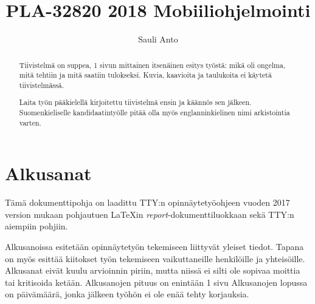 \documentclass[globalnumbering,centeredcaptions,draftfooter]{tutthesis/tutthesis} %
\author{Sauli Anto}
\title{PLA-32820 2018 Mobiiliohjelmointi}
\begin{document}
\maketitle



\begin{abstract}
Tiivistelmä on suppea, 1 sivun mittainen itsenäinen esitys työstä: mikä oli ongelma, mitä tehtiin ja mitä saatiin tulokseksi.
Kuvia, kaavioita ja taulukoita ei käytetä tiivistelmässä.

Laita työn pääkielellä kirjoitettu tiivistelmä ensin ja käännös sen jälkeen.
Suomenkieliselle kandidaatintyölle pitää olla myös englanninkielinen nimi arkistointia varten.
\end{abstract}

\iffalse
\begin{otherlanguage}{english}

\title{Tampere University of Technology thesis template}
\programme{...}
\thesisdescription{...}

\begin{abstract}
The abstract is a self-contained, concise description of the thesis: what was the problem, what was done, what was the result.
Do not include charts or tables in the abstract.

First include the abstract written in the main language of the thesis and then the translation.
A bachelor's thesis in Finnish must also have a name in English for archival.
\end{abstract}
\end{otherlanguage}
\fi


\chapter*{Alkusanat}

Tämä dokumenttipohja on laadittu TTY:n opinnäytetyöohjeen vuoden 2017 version mukaan pohjautuen LaTeXin \emph{report}-dokumenttiluokkaan sekä TTY:n aiempiin pohjiin.

Alkusanoissa esitetään opinnäytetyön tekemiseen liittyvät yleiset tiedot.
Tapana on myös esittää kiitokset työn tekemiseen vaikuttaneille henkilöille ja yhteisöille.
Alkusanat eivät kuulu arvioinnin piriin, mutta niissä ei silti ole sopivaa moittia tai kritisoida ketään.
Alkusanojen pituus on enintään 1 sivu
Alkusanojen lopussa on päivämäärä, jonka jälkeen työhön ei ole enää tehty korjauksia.
\end{document}
